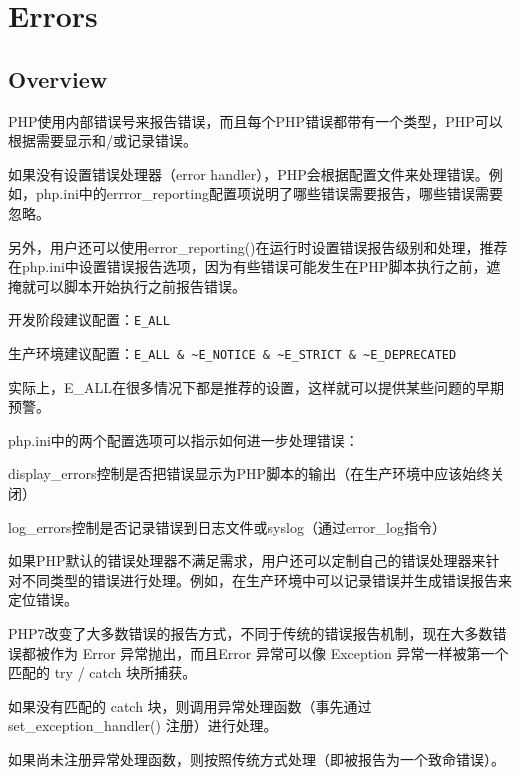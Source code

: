\part{Errors}


\chapter{Overview}

PHP使用内部错误号来报告错误，而且每个PHP错误都带有一个类型，PHP可以根据需要显示和/或记录错误。

如果没有设置错误处理器（error handler），PHP会根据配置文件来处理错误。例如，php.ini中的errror\_reporting配置项说明了哪些错误需要报告，哪些错误需要忽略。

另外，用户还可以使用error\_reporting()在运行时设置错误报告级别和处理，推荐在php.ini中设置错误报告选项，因为有些错误可能发生在PHP脚本执行之前，遮掩就可以脚本开始执行之前报告错误。

\begin{compactitem}
\item 开发阶段建议配置：\texttt{E\_ALL}
\item 生产环境建议配置：\texttt{E\_ALL \& \~{}E\_NOTICE \& \~{}E\_STRICT \& \~{}E\_DEPRECATED}
\end{compactitem}

实际上，E\_ALL在很多情况下都是推荐的设置，这样就可以提供某些问题的早期预警。

php.ini中的两个配置选项可以指示如何进一步处理错误：

\begin{compactitem}
\item display\_errors控制是否把错误显示为PHP脚本的输出（在生产环境中应该始终关闭）

\item log\_errors控制是否记录错误到日志文件或syslog（通过error\_log指令）
\end{compactitem}

如果PHP默认的错误处理器不满足需求，用户还可以定制自己的错误处理器来针对不同类型的错误进行处理。例如，在生产环境中可以记录错误并生成错误报告来定位错误。

PHP7改变了大多数错误的报告方式，不同于传统的错误报告机制，现在大多数错误都被作为 Error 异常抛出，而且Error 异常可以像 Exception 异常一样被第一个匹配的 try / catch 块所捕获。

\begin{compactitem}
\item 如果没有匹配的 catch 块，则调用异常处理函数（事先通过 set\_exception\_handler() 注册）进行处理。 
\item 如果尚未注册异常处理函数，则按照传统方式处理（即被报告为一个致命错误）。
\end{compactitem}


